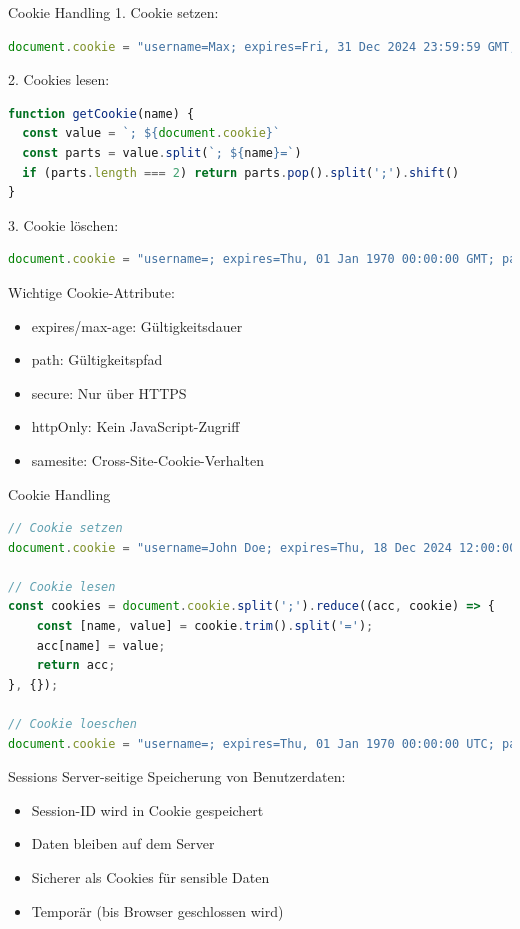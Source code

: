 \begin{KR}{Cookie Handling}
1. Cookie setzen:
\begin{lstlisting}[language=JavaScript, style=basesmol]
document.cookie = "username=Max; expires=Fri, 31 Dec 2024 23:59:59 GMT; path=/"
\end{lstlisting}

2. Cookies lesen:
\begin{lstlisting}[language=JavaScript, style=basesmol]
function getCookie(name) {
  const value = `; ${document.cookie}`
  const parts = value.split(`; ${name}=`)
  if (parts.length === 2) return parts.pop().split(';').shift()
}
\end{lstlisting}

3. Cookie löschen:
\begin{lstlisting}[language=JavaScript, style=basesmol]
document.cookie = "username=; expires=Thu, 01 Jan 1970 00:00:00 GMT; path=/"
\end{lstlisting}

Wichtige Cookie-Attribute:
\begin{itemize}
  \item expires/max-age: Gültigkeitsdauer
  \item path: Gültigkeitspfad
  \item secure: Nur über HTTPS
  \item httpOnly: Kein JavaScript-Zugriff
  \item samesite: Cross-Site-Cookie-Verhalten
\end{itemize}
\end{KR}

\begin{KR}{Cookie Handling}
\begin{lstlisting}[language=JavaScript, style=basesmol]
// Cookie setzen
document.cookie = "username=John Doe; expires=Thu, 18 Dec 2024 12:00:00 UTC; path=/";

// Cookie lesen
const cookies = document.cookie.split(';').reduce((acc, cookie) => {
    const [name, value] = cookie.trim().split('=');
    acc[name] = value;
    return acc;
}, {});

// Cookie loeschen
document.cookie = "username=; expires=Thu, 01 Jan 1970 00:00:00 UTC; path=/;";
\end{lstlisting}
\end{KR}

\begin{concept}{Sessions}
    Server-seitige Speicherung von Benutzerdaten:
    \begin{itemize}
        \item Session-ID wird in Cookie gespeichert
        \item Daten bleiben auf dem Server
        \item Sicherer als Cookies für sensible Daten
        \item Temporär (bis Browser geschlossen wird)
    \end{itemize}
\end{concept}

